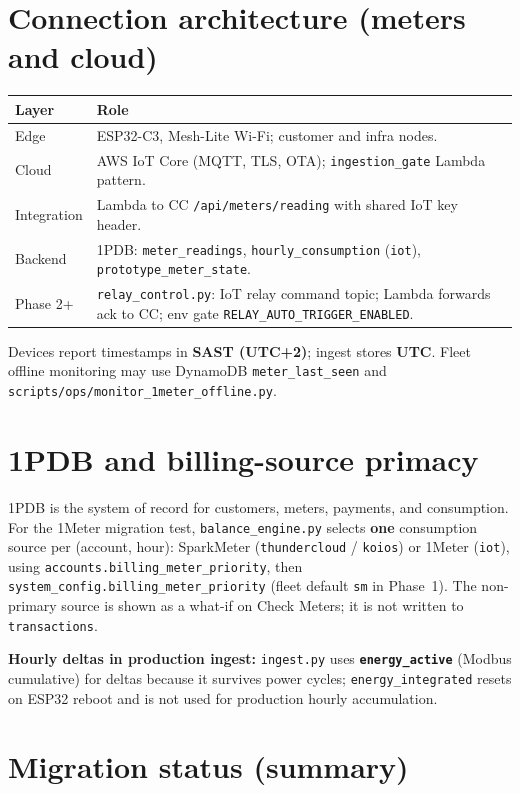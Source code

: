 \documentclass[11pt,a4paper]{article}
\begin{document}
\section{Connection architecture (meters and cloud)}

\begin{tabularx}{\linewidth}{@{}lX@{}}
\toprule
\textbf{Layer} & \textbf{Role} \\
\midrule
Edge & ESP32-C3, Mesh-Lite Wi-Fi; customer and infra nodes. \\
Cloud & AWS IoT Core (MQTT, TLS, OTA); \texttt{ingestion\_gate} Lambda pattern. \\
Integration & Lambda to CC \texttt{/api/meters/reading} with shared IoT key header. \\
Backend & 1PDB: \texttt{meter\_readings}, \texttt{hourly\_consumption} (\texttt{iot}), \texttt{prototype\_meter\_state}. \\
Phase 2+ & \texttt{relay\_control.py}: IoT relay command topic; Lambda forwards ack to CC; env gate \texttt{RELAY\_AUTO\_TRIGGER\_ENABLED}. \\
\bottomrule
\end{tabularx}

Devices report timestamps in \textbf{SAST (UTC+2)}; ingest stores \textbf{UTC}. Fleet offline monitoring may use DynamoDB \texttt{meter\_last\_seen} and \texttt{scripts/ops/monitor\_1meter\_offline.py}.

\section{1PDB and billing-source primacy}

1PDB is the system of record for customers, meters, payments, and consumption. For the 1Meter migration test, \texttt{balance\_engine.py} selects \textbf{one} consumption source per (account, hour): SparkMeter (\texttt{thundercloud} / \texttt{koios}) or 1Meter (\texttt{iot}), using \texttt{accounts.billing\_meter\_priority}, then \texttt{system\_config.billing\_meter\_priority} (fleet default \texttt{sm} in Phase~1). The non-primary source is shown as a what-if on Check Meters; it is not written to \texttt{transactions}.

\textbf{Hourly deltas in production ingest:} \texttt{ingest.py} uses \textbf{\texttt{energy\_active}} (Modbus cumulative) for deltas because it survives power cycles; \texttt{energy\_integrated} resets on ESP32 reboot and is not used for production hourly accumulation.

\section{Migration status (summary)}
\end{document}
